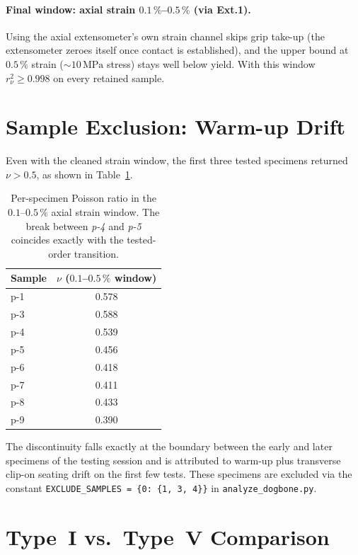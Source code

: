 \paragraph{Final window: axial strain $0.1\,\%$--$0.5\,\%$ (via Ext.1).}
Using the axial extensometer's own strain channel skips grip take-up
(the extensometer zeroes itself once contact is established), and the upper
bound at $0.5\,\%$ strain ($\sim 10\,\mathrm{MPa}$ stress) stays well below
yield. With this window $r^{2}_{\nu} \geq 0.998$ on every retained sample.

\section{Sample Exclusion: Warm-up Drift}
\label{sec:poisson-exclusion}

Even with the cleaned strain window, the first three tested specimens returned
$\nu > 0.5$, as shown in Table~\ref{tab:poisson-perspecimen}.

\begin{table}[!ht]
  \centering
  \caption{Per-specimen Poisson ratio in the $0.1$--$0.5\,\%$ axial strain
           window. The break between \textit{p-4} and \textit{p-5} coincides
           exactly with the tested-order transition.}
  \label{tab:poisson-perspecimen}
  \begin{tabular}{lc}
    \toprule
    Sample & $\nu$ ($0.1$--$0.5\,\%$ window) \\
    \midrule
    p-1 & 0.578 \\
    p-3 & 0.588 \\
    p-4 & 0.539 \\
    \midrule
    p-5 & 0.456 \\
    p-6 & 0.418 \\
    p-7 & 0.411 \\
    p-8 & 0.433 \\
    p-9 & 0.390 \\
    \bottomrule
  \end{tabular}
\end{table}

The discontinuity falls exactly at the boundary between the early and later
specimens of the testing session and is attributed to warm-up plus transverse
clip-on seating drift on the first few tests. These specimens are excluded
via the constant \verb|EXCLUDE_SAMPLES = {0: {1, 3, 4}}| in
\texttt{analyze\_dogbone.py}.

\section{Type~I vs.\ Type~V Comparison}
\label{sec:poisson-typecompare}

